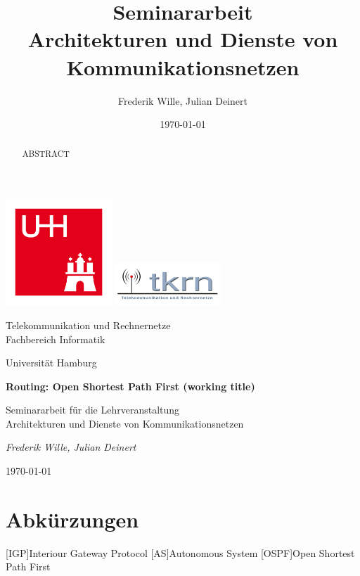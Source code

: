 \documentclass[1pt,a4paper,final]{article}
\title{\LARGE \bf
Seminararbeit\\ Architekturen und Dienste von Kommunikationsnetzen
}
\author{Frederik Wille, Julian Deinert}
\date{\today}
\begin{document}

\begin{titlepage}
	\centering
	\includegraphics[width=0.3\textwidth]{images/uhh_logo.jpg}\hspace{1cm}
	\includegraphics[width=0.3\textwidth]{images/tkrn_logo.jpg}\par
	{\Large Telekommunikation und Rechnernetze \\}
	{\large Fachbereich Informatik\\}
	{\large Universität Hamburg \par}
	\vspace{1.5cm}
	{\huge\bfseries Routing: Open Shortest Path First (working title)\par}
	\vspace{1.5cm}
	{\large Seminararbeit für die Lehrveranstaltung \\ \Large Architekturen und Dienste von Kommunikationsnetzen\par}
	
	\vfill
	\vfill
	{\Large\itshape Frederik Wille, Julian Deinert\par}

	\vfill

	{\large \today\par}
\end{titlepage}
\thispagestyle{empty}
\newpage
\thispagestyle{empty}
\tableofcontents
\newpage
\setcounter{page}{1}

\section*{Abkürzungen}
\begin{acronym}
		[IGP]{Interiour Gateway Protocol}
		[AS]{Autonomous System}
		{Open Shortest Path First}
\end{acronym}
\newpage
\begin{abstract}
ABSTRACT

\end{abstract}
\end{document}
